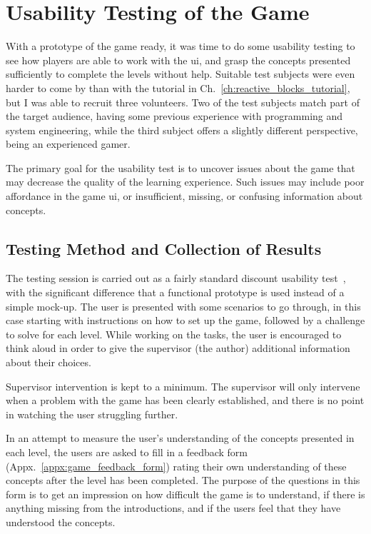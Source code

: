\section{Usability Testing of the Game}
\label{sec:game_testing}
With a prototype of the game ready, it was time to do some usability testing to see how players are able to work with the \gls{ui}, and grasp the concepts presented sufficiently to complete the levels without help. Suitable test subjects were even harder to come by than with the tutorial in Ch.~\ref{ch:reactive_blocks_tutorial}, but I was able to recruit three volunteers. Two of the test subjects match part of the target audience, having some previous experience with programming and system engineering, while the third subject offers a slightly different perspective, being an experienced gamer.

\noindent
The primary goal for the usability test is to uncover issues about the game that may decrease the quality of the learning experience. Such issues may include poor affordance in the game \gls{ui}, or insufficient, missing, or confusing information about concepts.

\subsection{Testing Method and Collection of Results}
\label{sec:game_testing_method}
The testing session is carried out as a fairly standard discount usability test~\cite{nielsen:discount_usability}, with the significant difference that a functional prototype is used instead of a simple mock-up. The user is presented with some scenarios to go through, in this case starting with instructions on how to set up the game, followed by a challenge to solve for each level. While working on the tasks, the user is encouraged to think aloud in order to give the supervisor (the author) additional information about their choices.

\noindent
Supervisor intervention is kept to a minimum. The supervisor will only intervene when a problem with the game has been clearly established, and there is no point in watching the user struggling further.

\noindent
In an attempt to measure the user's understanding of the concepts presented in each level, the users are asked to fill in a feedback form (Appx.~\ref{appx:game_feedback_form}) rating their own understanding of these concepts after the level has been completed. The purpose of the questions in this form is to get an impression on how difficult the game is to understand, if there is anything missing from the introductions, and if the users feel that they have understood the concepts.

